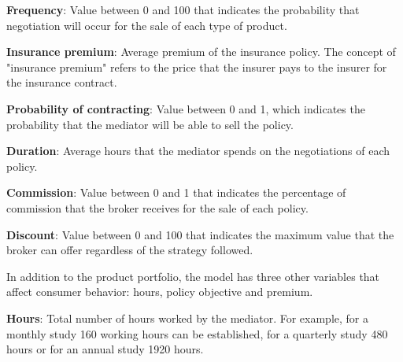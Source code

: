 \documentclass[review]{elsarticle}
\begin{document}
\textbf{Frequency}: Value between 0 and 100 that indicates the probability that negotiation will occur for the sale of each type of product.

\textbf{Insurance premium}: Average premium of the insurance policy. The concept of "insurance premium" refers to the price that the insurer pays to the insurer for the insurance contract.

\textbf{Probability of contracting}: Value between 0 and 1, which indicates the probability that the mediator will be able to sell the policy.

\textbf{Duration}: Average hours that the mediator spends on the negotiations of each policy.

\textbf{Commission}: Value between 0 and 1 that indicates the percentage of commission that the broker receives for the sale of each policy.

\textbf{Discount}: Value between 0 and 100 that indicates the maximum value that the broker can offer regardless of the strategy followed.

In addition to the product portfolio, the model has three other variables that affect consumer behavior: hours, policy objective and premium.

\textbf{Hours}: Total number of hours worked by the mediator. For example, for a monthly study 160 working hours can be established, for a quarterly study 480 hours or for an annual study 1920 hours.
\end{document}
